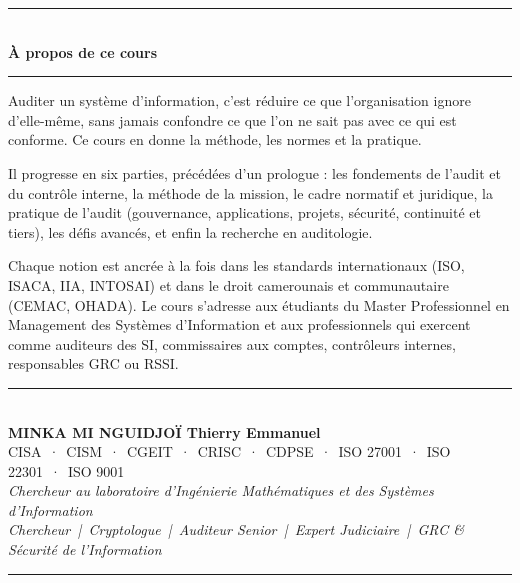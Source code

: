 \documentclass[12pt, twoside, openright, a4paper]{book}
\begin{document}
\vspace*{2.5cm}

\begin{center}
    {\color{CouleurAccent}\rule{0.6\linewidth}{1pt}}\\[1.5ex]
    {\color{white}\Large\bfseries À propos de ce cours}\\[1.5ex]
    {\color{CouleurAccent}\rule{0.6\linewidth}{1pt}}
\end{center}

\vspace{1cm}

\begin{center}
\begin{minipage}{0.75\textwidth}
\color{white!85!gray}
Auditer un système d'information, c'est réduire ce que l'organisation
ignore d'elle-même, sans jamais confondre ce que l'on ne sait pas avec ce
qui est conforme. Ce cours en donne la méthode, les normes et la pratique.

\medskip

Il progresse en six parties, précédées d'un prologue : les fondements de
l'audit et du contrôle interne, la méthode de la mission, le cadre normatif
et juridique, la pratique de l'audit (gouvernance, applications, projets,
sécurité, continuité et tiers), les défis avancés, et enfin la recherche en
auditologie.

\medskip

Chaque notion est ancrée à la fois dans les standards internationaux (ISO,
ISACA, IIA, INTOSAI) et dans le droit camerounais et communautaire (CEMAC,
OHADA). Le cours s'adresse aux étudiants du Master Professionnel en
Management des Systèmes d'Information et aux professionnels qui exercent comme
auditeurs des SI, commissaires aux comptes, contrôleurs internes,
responsables GRC ou RSSI.
\end{minipage}
\end{center}

\vfill

\begin{center}
    {\color{CouleurAccent}\rule{0.7\linewidth}{1.2pt}}\\[1.2ex]
    {\color{white}\large\bfseries MINKA MI NGUIDJOÏ Thierry Emmanuel}\\[0.4ex]
    {\color{white!80!gray}\small
        CISA~·~CISM~·~CGEIT~·~CRISC~·~CDPSE~·~ISO 27001~·~ISO 22301~·~ISO 9001}\\[0.3ex]
    {\color{white!70!gray}\footnotesize\itshape
        Chercheur au laboratoire d'Ingénierie Mathématiques et des Systèmes d'Information}\\[0.3ex]
    {\color{white!70!gray}\footnotesize\itshape
        Chercheur~|~Cryptologue~|~Auditeur Senior~|~Expert Judiciaire~|~GRC \& Sécurité de l'Information}\\[1.2ex]
    {\color{CouleurAccent}\rule{0.7\linewidth}{1.2pt}}
\end{center}

\vspace{1cm}

\afterpage{\nopagecolor}
\end{document}
